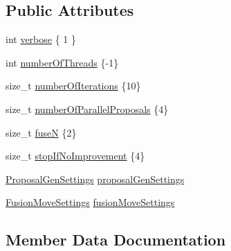 \subsection*{Public Attributes}
\begin{DoxyCompactItemize}
\item 
int \hyperlink{structnifty_1_1graph_1_1optimization_1_1multicut_1_1FusionMoveBased_1_1Settings_a2c319dc2449b03a86dff54cfe44c2043}{verbose} \{ 1 \}
\item 
int \hyperlink{structnifty_1_1graph_1_1optimization_1_1multicut_1_1FusionMoveBased_1_1Settings_aa8944e2c3f7e9d9da85c83fd760bb782}{number\+Of\+Threads} \{-\/1\}
\item 
size\+\_\+t \hyperlink{structnifty_1_1graph_1_1optimization_1_1multicut_1_1FusionMoveBased_1_1Settings_a5d35c35055bfe2b86d26d41dc6b3a37d}{number\+Of\+Iterations} \{10\}
\item 
size\+\_\+t \hyperlink{structnifty_1_1graph_1_1optimization_1_1multicut_1_1FusionMoveBased_1_1Settings_ab28409f45fc68eb7ae9b97422f8b9570}{number\+Of\+Parallel\+Proposals} \{4\}
\item 
size\+\_\+t \hyperlink{structnifty_1_1graph_1_1optimization_1_1multicut_1_1FusionMoveBased_1_1Settings_aa73c503cd6c8f9d0fa2048ab41f12ee8}{fuse\+N} \{2\}
\item 
size\+\_\+t \hyperlink{structnifty_1_1graph_1_1optimization_1_1multicut_1_1FusionMoveBased_1_1Settings_adf6ad1d8f27a2561b74d6d70668b2d42}{stop\+If\+No\+Improvement} \{4\}
\item 
\hyperlink{classnifty_1_1graph_1_1optimization_1_1multicut_1_1FusionMoveBased_ac219e5b9c0d18290b0d78f27f6da1391}{Proposal\+Gen\+Settings} \hyperlink{structnifty_1_1graph_1_1optimization_1_1multicut_1_1FusionMoveBased_1_1Settings_a29e4c10a65fdc4483005acdb741aa7d5}{proposal\+Gen\+Settings}
\item 
\hyperlink{classnifty_1_1graph_1_1optimization_1_1multicut_1_1FusionMoveBased_a48bce13d9942a0e291bee469625c9da7}{Fusion\+Move\+Settings} \hyperlink{structnifty_1_1graph_1_1optimization_1_1multicut_1_1FusionMoveBased_1_1Settings_ac7ed713bd704675dba2eb79e77c45f56}{fusion\+Move\+Settings}
\end{DoxyCompactItemize}


\subsection{Member Data Documentation}
\hypertarget{structnifty_1_1graph_1_1optimization_1_1multicut_1_1FusionMoveBased_1_1Settings_aa73c503cd6c8f9d0fa2048ab41f12ee8}{}
